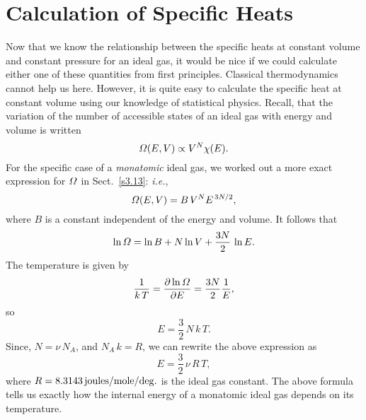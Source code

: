 \section{Calculation of Specific Heats}
Now that we know the relationship  between the specific heats at constant volume and
constant pressure for an ideal gas, 
it would be nice if we could calculate either one of these quantities
from first principles. Classical thermodynamics cannot help us here. However,
it is quite easy to calculate the specific heat at constant volume using our
knowledge of statistical physics. Recall, that the variation of the number of
accessible states of an ideal gas with  energy and volume is written
\begin{equation}
{\mit\Omega}(E, V) \propto V^N \chi(E).
\end{equation}
For the specific case of a {\em monatomic}\/ ideal gas, we worked out a more exact
expression for ${\mit\Omega}$ in Sect.~\ref{s3.13}: {\em i.e.}, 
\begin{equation}
{\mit\Omega} (E, V) = B\, V^N E^{\,3N/2},
\end{equation}
where $B$ is a constant independent of the energy and  volume. It follows that
\begin{equation}
\ln {\mit\Omega} = \ln B + N\ln V +\frac{3N}{2}\, \ln E.
\end{equation}
The temperature is given by
\begin{equation}
\frac{1}{k\,T} = \frac{\partial \ln{\mit\Omega}}{\partial E} = \frac{3N}{2} \frac{1}{E},
\end{equation}
so
\begin{equation}
E = \frac{3}{2}\, N \,k\,T.
\end{equation}
Since, $N = \nu \,N_A$, and $N_A \,k=R$, we can rewrite the above expression as
\begin{equation}
E = \frac{3}{2}\, \nu\, R\,T,
\end{equation}
where $R= 8.3143\,{\rm joules/mole/deg.}$ is the ideal gas constant. The above 
formula tells us exactly how the internal energy of a monatomic ideal gas
depends on its temperature. 

